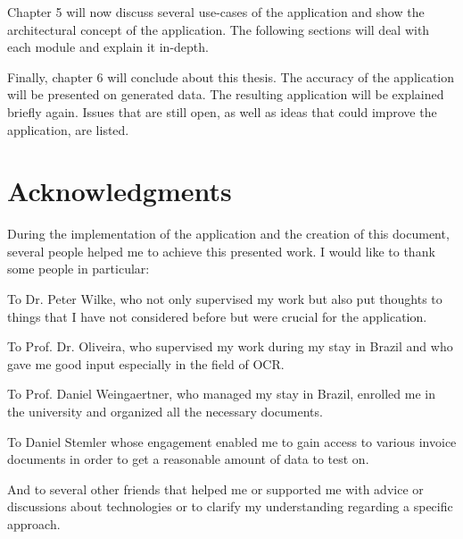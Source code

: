 Chapter 5 will now discuss several use-cases of the application and show the architectural concept of the application. The following sections will deal with each module and explain it in-depth.

Finally, chapter 6 will conclude about this thesis. The accuracy of the application will be presented on generated data. The resulting application will be explained briefly again. Issues that are still open, as well as ideas that could improve the application, are listed.

\section{Acknowledgments}
\label{sec1.7}

During the implementation of the application and the creation of this document, several people helped me to achieve this presented work. I would like to thank some people in particular:

To Dr. Peter Wilke, who not only supervised my work but also put thoughts to things that I have not considered before but were crucial for the application.

To Prof. Dr. Oliveira, who supervised my work during my stay in Brazil and who gave me good input especially in the field of OCR.

To Prof. Daniel Weingaertner, who managed my stay in Brazil, enrolled me in the university and organized all the necessary documents.

To Daniel Stemler whose engagement enabled me to gain access to various invoice documents in order to get a reasonable amount of data to test on.

And to several other friends that helped me or supported me with advice or discussions about technologies or to clarify my understanding regarding a specific approach.